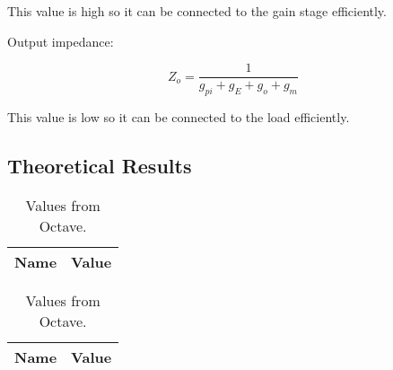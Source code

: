 This value is high so it can be connected to the gain stage efficiently.

Output impedance:

\[
Z_o = \frac{1}{g_{pi}+g_E+g_o+g_m}
\]

This value is low so it can be connected to the load efficiently.






\subsection{Theoretical Results}
\label{subsec:res_the}

\begin{table}[h]
	\centering
	\begin{tabular}{|l|r|}
		\hline    
		{\bf Name} & {\bf Value} \\ \hline
    		
	\end{tabular}
	
	\caption{Values from Octave.}
    
\label{tab:op_teo}
\end{table}

\begin{table}[h]
	\centering
	\begin{tabular}{|l|r|}
		\hline    
		{\bf Name} & {\bf Value} \\ \hline
    		
	\end{tabular}
	
	\caption{Values from Octave.}
    
\label{tab:imp_teo}
\end{table}
